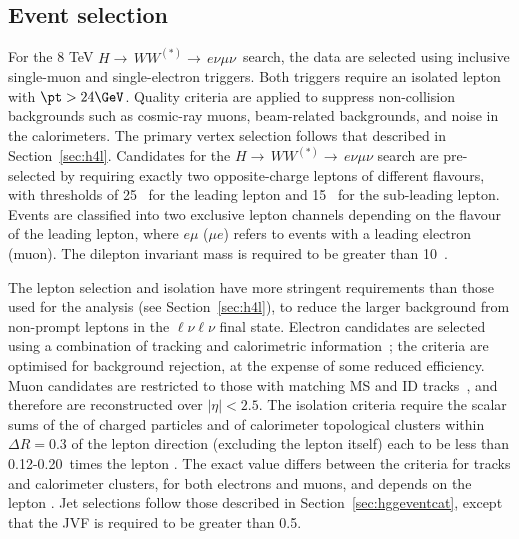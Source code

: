 \documentclass[final,3p,times,twocolumn]{elsarticle}
\newcommand{\lelm}{\ensuremath{H{\rightarrow\,}WW^{(\ast)}{\rightarrow\,}e \nu \mu \nu}}
\def\IsoCutRange{0.12-0.20}
\def\IsoConeSize{\ensuremath{0.3}}
\begin{document}
\subsection{Event selection}
\label{sec:selection}

For the 8 TeV \lelm\ search, the data are selected using inclusive single-muon and single-electron triggers.
Both triggers require an isolated lepton with $\pt > 24\GeV$.  
Quality criteria are applied  to suppress
non-collision backgrounds
such as cosmic-ray muons, beam-related
backgrounds, and noise in the calorimeters.
The primary vertex selection follows that described in Section~\ref{sec:h4l}.
Candidates for the $\lelm$ search are pre-selected by requiring exactly two opposite-charge 
leptons of different flavours, with \pt{} thresholds of 25~\GeV{} for the leading lepton and 15~\GeV{} for the
sub-leading lepton. 
Events are classified into two exclusive lepton channels depending on the
flavour of the leading lepton, where  $e\mu$ ($\mu e$) refers to events with a leading electron (muon).  
The dilepton invariant mass is required to be greater than 10~\GeV.

The lepton selection and isolation have more stringent requirements  
than those used for the \htollllp{} analysis (see Section~\ref{sec:h4l}), 
to reduce the larger background from non-prompt leptons
in the $\ell\nu\ell\nu$ final state.  Electron candidates are selected using a combination of 
tracking and calorimetric information~\cite{Aad:2011mk}; the criteria are optimised for 
background rejection, at the expense of some reduced efficiency.  Muon candidates are restricted to those 
with matching MS and ID tracks~\cite{ATLAS-CONF-2011-063}, and therefore are reconstructed over  
$|\eta|< 2.5$.  The isolation criteria require
the scalar sums of the \pt{} of charged particles and of calorimeter topological clusters within 
$\Delta R=\IsoConeSize$ of the lepton direction 
(excluding the lepton itself) each 
to be less than \IsoCutRange\ times the lepton \pt. The exact value differs  
between the criteria for tracks and calorimeter clusters, for both electrons
and muons, and depends on the lepton \pt. 
Jet selections follow those described in Section~\ref{sec:hggeventcat}, except that  
the 
JVF
is required to be
greater than 0.5.
\end{document}
